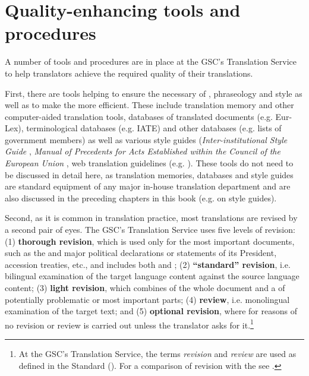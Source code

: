 \documentclass[output=paper]{langsci/langscibook}
\begin{document}
\section{Quality-enhancing tools and procedures}\label{sec:hanzl:hanzl:3}

A number of tools and procedures are in place at the GSC's Translation Service to help translators achieve the required quality of their translations.

First, there are tools helping to ensure the necessary  of , phraseology and style as well as to make the  more efficient. These include translation memory and other computer-aided translation tools, databases of translated documents (e.g. Eur-Lex), terminological databases (e.g. IATE) and other databases (e.g. lists of government members) as well as various style guides (\textit{Inter-institutional Style Guide} \citep{PublicationsOffice2011}, \textit{Manual of Precedents for Acts Established within the Council of the European Union} \citep{Council2010a}, web translation guidelines (e.g. \citealt{Council2016b}). These tools do not need to be discussed in detail here, as translation memories, databases and style guides are standard equipment of any major in-house translation department and are also discussed in the preceding chapters in this book (e.g. \citeauthor{Svoboda2013} on style guides).

Second, as it is common in translation practice, most translations are revised by a second pair of eyes. The GSC's Translation Service uses five levels of revision: (1) \textbf{thorough revision}, which is used only for the most important documents, such as the  and major political declarations or statements of its President, accession treaties, etc., and includes both  and ; (2) \textbf{“standard” revision}, i.e. bilingual examination of the target language content against the source language content; (3) \textbf{light revision}, which combines  of the whole document and a  of potentially problematic or most important parts; (4) \textbf{review}, i.e. monolingual examination of the target text; and (5) \textbf{optional revision}, where for reasons of  no revision or review is carried out unless the translator asks for it.\footnote{At the GSC's Translation Service, the terms \textit{revision} and \textit{review} are used as defined in the  Standard  (\citeyear{ISO2015}). For a comparison of revision with the  see \citet{Martin2007}.}
\end{document}
